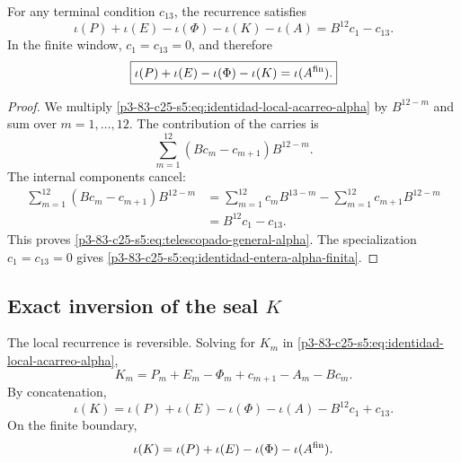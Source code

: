 \begin{theorem}
\label{p3-83-c25-s5:thm:telescopado-acarreos-alpha}
For any terminal condition \(c_{13}\), the recurrence satisfies
\begin{equation}
 \boxed{
 \iota(P)+\iota(E)-\iota(\Phi)-\iota(K)-\iota(A)
 =B^{12}c_1-c_{13}.}
 \label{p3-83-c25-s5:eq:telescopado-general-alpha}
\end{equation}
In the finite window, \(c_1=c_{13}=0\), and therefore
\begin{equation}
 \boxed{
 \iota(P)+\iota(E)-\iota(\Phi)-\iota(K)
 =\iota(A^{\rm fin}).}
 \label{p3-83-c25-s5:eq:identidad-entera-alpha-finita}
\end{equation}
\end{theorem}

\begin{proof}
We multiply \eqref{p3-83-c25-s5:eq:identidad-local-acarreo-alpha} by
\(B^{12-m}\) and sum over \(m=1,\ldots,12\). The contribution of the carries is
\[
 \sum_{m=1}^{12}
 (Bc_m-c_{m+1})B^{12-m}.
\]
The internal components cancel:
\begin{align*}
 \sum_{m=1}^{12}(Bc_m-c_{m+1})B^{12-m}
 &=\sum_{m=1}^{12}c_mB^{13-m}
   -\sum_{m=1}^{12}c_{m+1}B^{12-m}\\
 &=B^{12}c_1-c_{13}.
\end{align*}
This proves \eqref{p3-83-c25-s5:eq:telescopado-general-alpha}. The specialization
\(c_1=c_{13}=0\) gives \eqref{p3-83-c25-s5:eq:identidad-entera-alpha-finita}.
\end{proof}

\subsection{Exact inversion of the seal \texorpdfstring{\(K\)}{K}}

The local recurrence is reversible. Solving for \(K_m\) in
\eqref{p3-83-c25-s5:eq:identidad-local-acarreo-alpha},
\begin{equation}
 \boxed{
 K_m=P_m+E_m-\Phi_m+c_{m+1}-A_m-Bc_m.}
 \label{p3-83-c25-s5:eq:inversion-local-k-desde-alpha}
\end{equation}
By concatenation,
\begin{equation}
 \boxed{
 \iota(K)
 =\iota(P)+\iota(E)-\iota(\Phi)-\iota(A)
  -B^{12}c_1+c_{13}.}
 \label{p3-83-c25-s5:eq:inversion-concatenada-k-desde-alpha}
\end{equation}
On the finite boundary,
\[
 \iota(K)
 =\iota(P)+\iota(E)-\iota(\Phi)-\iota(A^{\rm fin}).
\]


